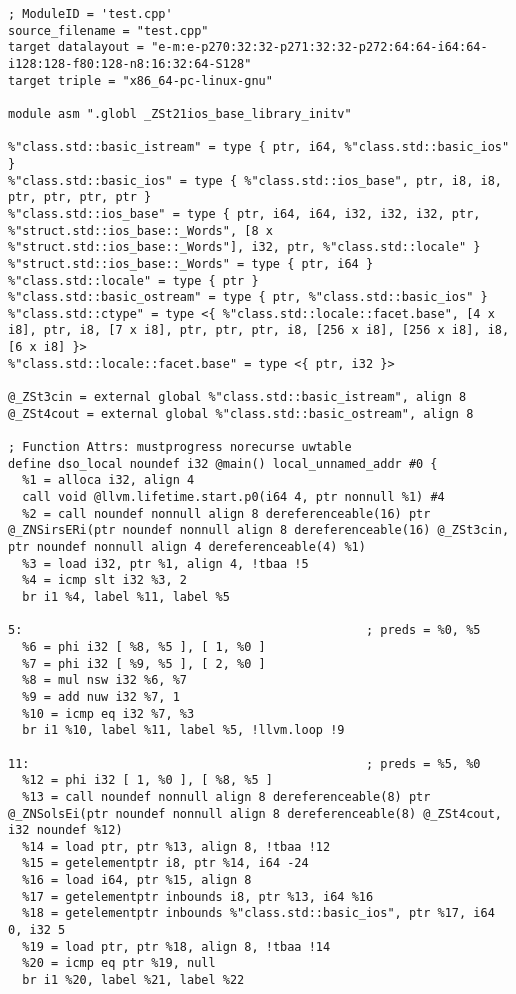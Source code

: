 \documentclass[UTF8,a4paper,10pt]{ctexart}
\begin{document}
\begin{lstlisting}[title=O1优化,frame=trbl]
; ModuleID = 'test.cpp'
source_filename = "test.cpp"
target datalayout = "e-m:e-p270:32:32-p271:32:32-p272:64:64-i64:64-i128:128-f80:128-n8:16:32:64-S128"
target triple = "x86_64-pc-linux-gnu"

module asm ".globl _ZSt21ios_base_library_initv"

%"class.std::basic_istream" = type { ptr, i64, %"class.std::basic_ios" }
%"class.std::basic_ios" = type { %"class.std::ios_base", ptr, i8, i8, ptr, ptr, ptr, ptr }
%"class.std::ios_base" = type { ptr, i64, i64, i32, i32, i32, ptr, %"struct.std::ios_base::_Words", [8 x %"struct.std::ios_base::_Words"], i32, ptr, %"class.std::locale" }
%"struct.std::ios_base::_Words" = type { ptr, i64 }
%"class.std::locale" = type { ptr }
%"class.std::basic_ostream" = type { ptr, %"class.std::basic_ios" }
%"class.std::ctype" = type <{ %"class.std::locale::facet.base", [4 x i8], ptr, i8, [7 x i8], ptr, ptr, ptr, i8, [256 x i8], [256 x i8], i8, [6 x i8] }>
%"class.std::locale::facet.base" = type <{ ptr, i32 }>

@_ZSt3cin = external global %"class.std::basic_istream", align 8
@_ZSt4cout = external global %"class.std::basic_ostream", align 8

; Function Attrs: mustprogress norecurse uwtable
define dso_local noundef i32 @main() local_unnamed_addr #0 {
  %1 = alloca i32, align 4
  call void @llvm.lifetime.start.p0(i64 4, ptr nonnull %1) #4
  %2 = call noundef nonnull align 8 dereferenceable(16) ptr @_ZNSirsERi(ptr noundef nonnull align 8 dereferenceable(16) @_ZSt3cin, ptr noundef nonnull align 4 dereferenceable(4) %1)
  %3 = load i32, ptr %1, align 4, !tbaa !5
  %4 = icmp slt i32 %3, 2
  br i1 %4, label %11, label %5

5:                                                ; preds = %0, %5
  %6 = phi i32 [ %8, %5 ], [ 1, %0 ]
  %7 = phi i32 [ %9, %5 ], [ 2, %0 ]
  %8 = mul nsw i32 %6, %7
  %9 = add nuw i32 %7, 1
  %10 = icmp eq i32 %7, %3
  br i1 %10, label %11, label %5, !llvm.loop !9

11:                                               ; preds = %5, %0
  %12 = phi i32 [ 1, %0 ], [ %8, %5 ]
  %13 = call noundef nonnull align 8 dereferenceable(8) ptr @_ZNSolsEi(ptr noundef nonnull align 8 dereferenceable(8) @_ZSt4cout, i32 noundef %12)
  %14 = load ptr, ptr %13, align 8, !tbaa !12
  %15 = getelementptr i8, ptr %14, i64 -24
  %16 = load i64, ptr %15, align 8
  %17 = getelementptr inbounds i8, ptr %13, i64 %16
  %18 = getelementptr inbounds %"class.std::basic_ios", ptr %17, i64 0, i32 5
  %19 = load ptr, ptr %18, align 8, !tbaa !14
  %20 = icmp eq ptr %19, null
  br i1 %20, label %21, label %22


\end{lstlisting}
\end{document}
